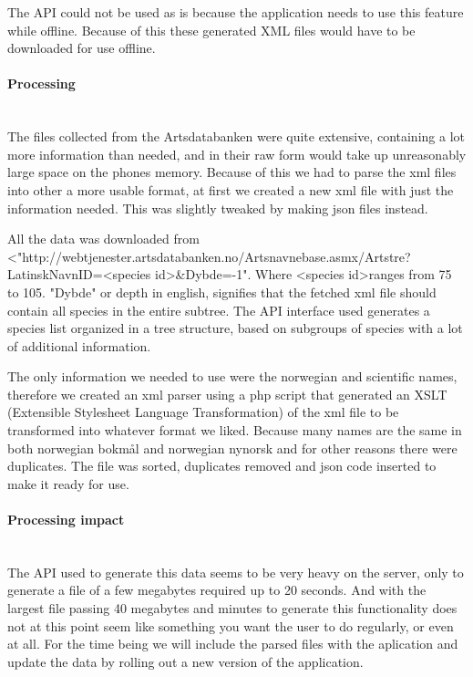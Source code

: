 		The API could not be used as is because the application needs to use this feature while offline. Because of this these generated XML files would have to be downloaded for use offline.

		\paragraph{Processing} \hspace{1mm}\\
		The files collected from the Artsdatabanken were quite extensive, containing a lot more information than needed, and in their raw form would take up unreasonably large space on the phones memory. 
		Because of this we had to parse the xml files into other a more usable format, at first we created a new xml file with just the information needed. 
		This was slightly tweaked by making json files instead.

		All the data was downloaded from
		<\newline"http://webtjenester.artsdatabanken.no/Artsnavnebase.asmx/Artstre? \newline LatinskNavnID=\textless species id\textgreater\&Dybde=-1".
		Where \textless species id\textgreater ranges from 75 to 105. "Dybde" or depth in english, signifies that the fetched xml file should contain all species in the entire subtree.
		The API interface used generates a species list organized in a tree structure, based on subgroups of species with a lot of additional information.

		The only information we needed to use were the norwegian and scientific names, therefore we created an xml parser using a php script that generated an XSLT (Extensible Stylesheet Language Transformation\cite{w3:xslt}) of the xml file to be transformed into whatever format we liked.
		Because many names are the same in both norwegian bokmål and norwegian nynorsk and for other reasons there were duplicates.
		The file was sorted, duplicates removed and json code inserted to make it ready for use.

		\paragraph{Processing impact} \hspace{1mm}\\
		The API used to generate this data seems to be very heavy on the server, only to generate a file of a few megabytes required up to 20 seconds. 
		And with the largest file passing 40 megabytes and minutes to generate this functionality does not at this point seem like something you want the user to do regularly, or even at all. 
		For the time being we will include the parsed files with the aplication and update the data by rolling out a new version of the application.

